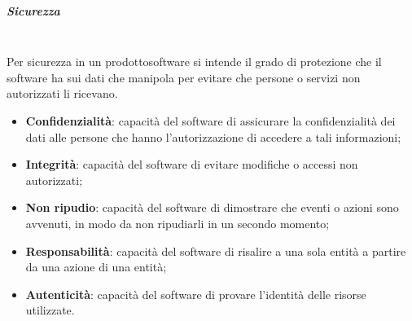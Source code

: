		\subparagraph{Sicurezza} \mbox{}\\
		Per sicurezza in un prodotto\glosp software si intende il grado di protezione che il software ha sui dati che manipola per evitare che persone o servizi non autorizzati li ricevano.
		\begin{itemize}
			\item \textbf{Confidenzialità}: capacità del software di assicurare la confidenzialità dei dati alle persone che hanno l'autorizzazione di accedere a tali informazioni;
			\item \textbf{Integrità}: capacità del software di evitare modifiche o accessi non autorizzati;
			\item \textbf{Non ripudio}: capacità del software di dimostrare che eventi o azioni sono avvenuti, in modo da non ripudiarli in un secondo momento;
			\item \textbf{Responsabilità}: capacità del software di risalire a una sola entità a partire da una azione di una entità;
			\item \textbf{Autenticità}: capacità del software di provare l'identità delle risorse utilizzate.
		\end{itemize}
	
